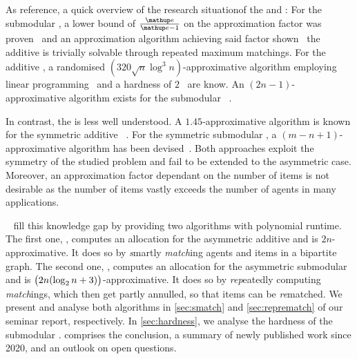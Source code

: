 As reference, a quick overview of the research situation\footnotemark[1] of the \USW{} and \ESW{}:
For the submodular \USW{}, a lower bound of \(\frac{\euler}{\euler - 1}\) on the approximation factor was proven~\cite{inapprox_results_for_combi_auctions_with_submod_utility_funcs} and an approximation algorithm achieving said factor shown~\cite{opt_approx_for_the_submod_nsw_in_the_value_oracle_model} \Dash the additive \USW{} is trivially solvable through repeated maximum matchings.
For the additive \ESW, a randomised \((320 \sqrt{n} \log^3 n)\)-approximative algorithm employing linear programming~\cite{an_approx_algo_for_maxmin_fair_alloc_of_indiv_goods} and a hardness of \(2\)~\cite{allocating_indiv_goods} are know.
An \((2n-1)\)-approximative algorithm exists for the submodular \ESW~\cite{approx_algo_for_the_maxmin_alloc_problem}.

In contrast, the \NSW{} is less well understood\footnotemark[1].
A \(1.45\)-approximative algorithm is known for the symmetric additive \NSW~\cite{finding_fair_and_efficient_allocs}.
For the symmetric submodular \NSW, a \((m - n + 1)\)-approximative algorithm has been devised~\cite{min_envy_and_max_avg_nsw_in_the_alloc_of_indiv_goods}.
Both approaches exploit the symmetry of the studied problem and fail to be extended to the asymmetric case.
Moreover, an approximation factor dependant on the number of items is not desirable as the number of items vastly exceeds the number of agents in many applications.

~\cite{APNSWuSVþUM} fill this knowledge gap by providing two algorithms with polynomial runtime.
The first one, \emph{\SMatch}, computes an allocation for the asymmetric additive \NSW{} and is \(2n\)-approximative.
It does so by \emph{s}martly \emph{match}ing agents and items in a bipartite graph.
The second one, \emph{\RepReMatch}, computes an allocation for the asymmetric submodular \NSW{} and is \(\paren[\big]{2n (\log_2 n + 3)}\)-approximative.
It does so by \emph{rep}eatedly computing \emph{match}ings, which then get partly annulled, so that items can be \emph{re}matched.
We present and analyse both algorithms in \cref{sec:smatch} and \cref{sec:reprematch} of our seminar report, respectively.
In \cref{sec:hardness}, we analyse the hardness of the submodular \NSW.
 comprises the conclusion, a summary of newly published work since 2020, and an outlook on open questions.



